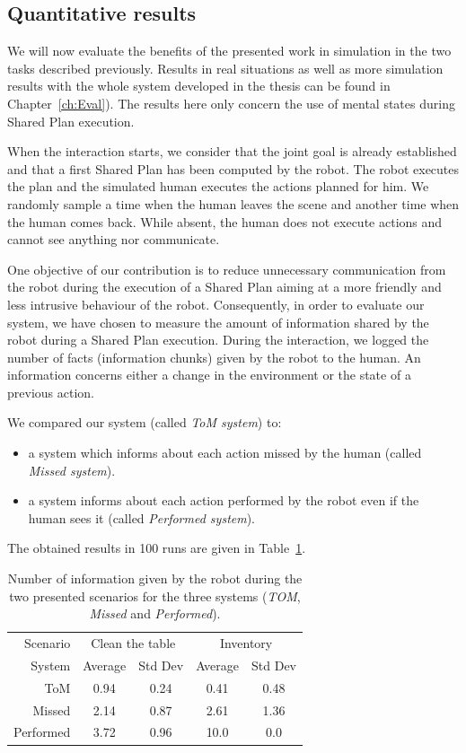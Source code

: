 \documentclass[english,a4paper,11pt,twoside]{StyleThese}
\begin{document}
\subsection{Quantitative results}

We will now evaluate the benefits of the presented work in simulation in the two tasks described previously. Results in real situations as well as more simulation results with the whole system developed in the thesis can be found in Chapter~\ref{ch:Eval}). The results here only concern the use of mental states during Shared Plan execution.

When the interaction starts, we consider that the joint goal is already established and that a first Shared Plan has been computed by the robot. The robot executes the plan and the simulated human executes the actions planned for him. We randomly sample a time when the human leaves the scene and another time when the human comes back. While absent, the human does not execute actions and cannot see anything nor communicate.

One objective of our contribution is to reduce unnecessary communication from the robot during the execution of a Shared Plan aiming at a more friendly and less intrusive behaviour of the robot. Consequently, in order to evaluate our system, we have chosen to measure the amount of information shared by the robot during a Shared Plan execution. During the interaction, we logged the number of facts (information chunks) given by the robot to the human. An information concerns either a change in the environment or the state of a previous action. 

We compared our system (called \textit{ToM system}) to:
\begin{itemize}
\item a system which informs about each action missed by the human (called \textit{Missed system}).
\item a system informs about each action performed by the robot even if the human sees it (called \textit{Performed system}).
\end{itemize}

The obtained results in 100 runs are given in Table~\ref{table:results}.

\begin{table}[ht]
\begin{center}
\begin{tabular}{|r||c|c||c|c|}
\hline
 Scenario & \multicolumn{2}{c||}{Clean the table} & \multicolumn{2}{c|}{Inventory}\\
\cline{2-5} 
System & Average & Std Dev & Average & Std Dev\\
\hline
\hline
ToM & 0.94 & 0.24 & 0.41 & 0.48\\
\hline
Missed & 2.14 & 0.87 & 2.61 & 1.36\\
\hline
Performed & 3.72 & 0.96 & 10.0 & 0.0\\
\hline
\end{tabular}
\end{center}
\caption{Number of information given by the robot during the two presented scenarios for the three systems (\textit{TOM}, \textit{Missed} and \textit{Performed}).}
\label{table:results}
\end{table}
\end{document}
